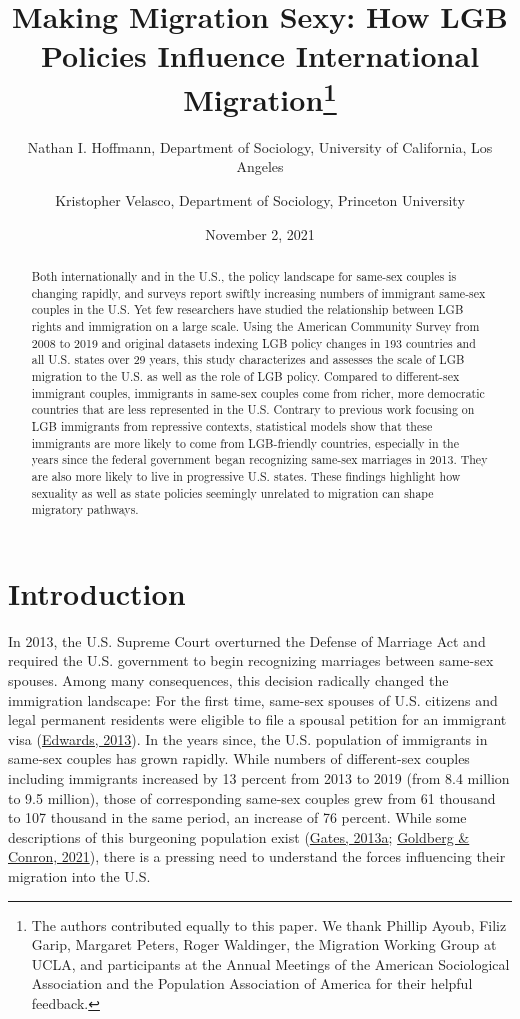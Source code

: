 \documentclass[
  12pt,
]{article}
\title{Making Migration Sexy: How LGB Policies Influence International Migration\thanks{The authors contributed equally to this paper. We thank Phillip Ayoub, Filiz Garip, Margaret Peters, Roger Waldinger, the Migration Working Group at UCLA, and participants at the Annual Meetings of the American Sociological Association and the Population Association of America for their helpful feedback.}}
\author{Nathan I. Hoffmann, Department of Sociology, University of California, Los Angeles \and Kristopher Velasco, Department of Sociology, Princeton University}
\date{November 2, 2021}
\begin{document}
\maketitle
\begin{abstract}
Both internationally and in the U.S., the policy landscape for same-sex couples is changing rapidly, and surveys report swiftly increasing numbers of immigrant same-sex couples in the U.S. Yet few researchers have studied the relationship between LGB rights and immigration on a large scale. Using the American Community Survey from 2008 to 2019 and original datasets indexing LGB policy changes in 193 countries and all U.S. states over 29 years, this study characterizes and assesses the scale of LGB migration to the U.S. as well as the role of LGB policy. Compared to different-sex immigrant couples, immigrants in same-sex couples come from richer, more democratic countries that are less represented in the U.S. Contrary to previous work focusing on LGB immigrants from repressive contexts, statistical models show that these immigrants are more likely to come from LGB-friendly countries, especially in the years since the federal government began recognizing same-sex marriages in 2013. They are also more likely to live in progressive U.S. states. These findings highlight how sexuality as well as state policies seemingly unrelated to migration can shape migratory pathways.
\end{abstract}

\hypertarget{introduction}{%
\section{Introduction}\label{introduction}}

In 2013, the U.S. Supreme Court overturned the Defense of Marriage Act and required the U.S. government to begin recognizing marriages between same-sex spouses. Among many consequences, this decision radically changed the immigration landscape: For the first time, same-sex spouses of U.S. citizens and legal permanent residents were eligible to file a spousal petition for an immigrant visa (\protect\hyperlink{ref-edwards_2013}{Edwards, 2013}). In the years since, the U.S. population of immigrants in same-sex couples has grown rapidly. While numbers of different-sex couples including immigrants increased by 13 percent from 2013 to 2019 (from 8.4 million to 9.5 million), those of corresponding same-sex couples grew from 61 thousand to 107 thousand in the same period, an increase of 76 percent. While some descriptions of this burgeoning population exist (\protect\hyperlink{ref-gates_2013}{Gates, 2013a}; \protect\hyperlink{ref-goldberg_2021}{Goldberg \& Conron, 2021}), there is a pressing need to understand the forces influencing their migration into the U.S.
\end{document}
